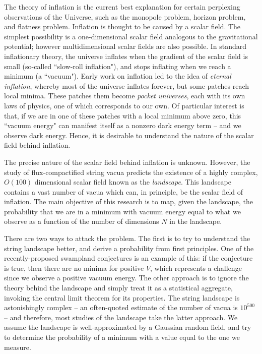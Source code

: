 \documentclass[12pt]{article}
\begin{document}

The theory of inflation is the current best explanation for certain perplexing observations of the Universe, such as the monopole problem, horizon problem, and flatness problem.\cite{Ryden} 
Inflation is thought to be caused by a scalar field. The simplest possibility is a one-dimensional scalar field analogous to the gravitational potential; however multidimensional scalar fields are also possible. In standard inflationary theory, the universe inflates when the gradient of the scalar field is small (so-called ``slow-roll inflation"), and stops inflating when we reach a minimum (a ``vacuum"). Early work on inflation led to the idea of \emph{eternal inflation}, whereby most of the universe inflates forever, but some patches reach local minima. These patches them become \emph{pocket universes}, each with its own laws of physics, one of which corresponds to our own. Of particular interest is that, if we are in one of these patches with a local minimum above zero, this ``vacuum energy" can manifest itself as a nonzero dark energy term -- and we observe dark energy. Hence, it is desirable to understand the nature of the scalar field behind inflation.

The precise nature of the scalar field behind inflation is unknown. However, the study of flux-compactified string vacua predicts the existence of a highly complex, $O(100)$ dimensional scalar field known as the \emph{landscape}. This landscape contains a vast number of vacua which can, in principle, be the scalar field of inflation. The main objective of this research is to map, given the landscape, the probability that we are in a minimum with vacuum energy equal to what we observe as a function of the number of dimensions $N$ in the landscape. 

There are two ways to attack the problem. The first is to try to understand the string landscape better, and derive a probability from first principles. One of the recently-proposed swampland conjectures is an example of this:\cite{Agrawal2018} if the conjecture is true, then there are no minima for positive $V$, which represents a challenge since we observe a positive vacuum energy. The other approach is to ignore the theory behind the landscape and simply treat it as a statistical aggregate, invoking the central limit theorem for its properties. The string landscape is astonishingly complex -- an often-quoted estimate of the number of vacua is $10^{500}$\cite{Douglas} -- and therefore, most studies of the landscape take the latter approach.\cite{GRF1, GRF2, GRF3} We assume the landscape is well-approximated by a Gaussian random field, and try to determine the probability of a minimum with a value equal to the one we measure.
\end{document}

